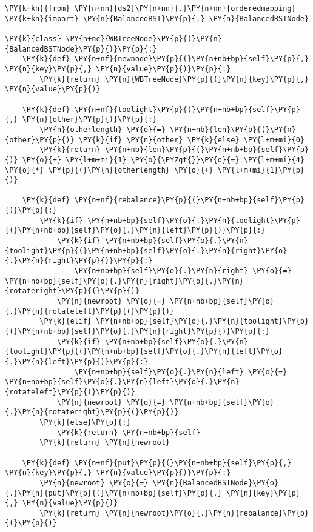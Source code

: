 \begin{Verbatim}[commandchars=\\\{\}]
\PY{k+kn}{from} \PY{n+nn}{ds2}\PY{n+nn}{.}\PY{n+nn}{orderedmapping} \PY{k+kn}{import} \PY{n}{BalancedBST}\PY{p}{,} \PY{n}{BalancedBSTNode}

\PY{k}{class} \PY{n+nc}{WBTreeNode}\PY{p}{(}\PY{n}{BalancedBSTNode}\PY{p}{)}\PY{p}{:}
    \PY{k}{def} \PY{n+nf}{newnode}\PY{p}{(}\PY{n+nb+bp}{self}\PY{p}{,} \PY{n}{key}\PY{p}{,} \PY{n}{value}\PY{p}{)}\PY{p}{:}
        \PY{k}{return} \PY{n}{WBTreeNode}\PY{p}{(}\PY{n}{key}\PY{p}{,} \PY{n}{value}\PY{p}{)}

    \PY{k}{def} \PY{n+nf}{toolight}\PY{p}{(}\PY{n+nb+bp}{self}\PY{p}{,} \PY{n}{other}\PY{p}{)}\PY{p}{:}
        \PY{n}{otherlength} \PY{o}{=} \PY{n+nb}{len}\PY{p}{(}\PY{n}{other}\PY{p}{)} \PY{k}{if} \PY{n}{other} \PY{k}{else} \PY{l+m+mi}{0}
        \PY{k}{return} \PY{n+nb}{len}\PY{p}{(}\PY{n+nb+bp}{self}\PY{p}{)} \PY{o}{+} \PY{l+m+mi}{1} \PY{o}{\PYZgt{}}\PY{o}{=} \PY{l+m+mi}{4} \PY{o}{*} \PY{p}{(}\PY{n}{otherlength} \PY{o}{+} \PY{l+m+mi}{1}\PY{p}{)}

    \PY{k}{def} \PY{n+nf}{rebalance}\PY{p}{(}\PY{n+nb+bp}{self}\PY{p}{)}\PY{p}{:}
        \PY{k}{if} \PY{n+nb+bp}{self}\PY{o}{.}\PY{n}{toolight}\PY{p}{(}\PY{n+nb+bp}{self}\PY{o}{.}\PY{n}{left}\PY{p}{)}\PY{p}{:}
            \PY{k}{if} \PY{n+nb+bp}{self}\PY{o}{.}\PY{n}{toolight}\PY{p}{(}\PY{n+nb+bp}{self}\PY{o}{.}\PY{n}{right}\PY{o}{.}\PY{n}{right}\PY{p}{)}\PY{p}{:}
                \PY{n+nb+bp}{self}\PY{o}{.}\PY{n}{right} \PY{o}{=} \PY{n+nb+bp}{self}\PY{o}{.}\PY{n}{right}\PY{o}{.}\PY{n}{rotateright}\PY{p}{(}\PY{p}{)}
            \PY{n}{newroot} \PY{o}{=} \PY{n+nb+bp}{self}\PY{o}{.}\PY{n}{rotateleft}\PY{p}{(}\PY{p}{)}
        \PY{k}{elif} \PY{n+nb+bp}{self}\PY{o}{.}\PY{n}{toolight}\PY{p}{(}\PY{n+nb+bp}{self}\PY{o}{.}\PY{n}{right}\PY{p}{)}\PY{p}{:}
            \PY{k}{if} \PY{n+nb+bp}{self}\PY{o}{.}\PY{n}{toolight}\PY{p}{(}\PY{n+nb+bp}{self}\PY{o}{.}\PY{n}{left}\PY{o}{.}\PY{n}{left}\PY{p}{)}\PY{p}{:}
                \PY{n+nb+bp}{self}\PY{o}{.}\PY{n}{left} \PY{o}{=} \PY{n+nb+bp}{self}\PY{o}{.}\PY{n}{left}\PY{o}{.}\PY{n}{rotateleft}\PY{p}{(}\PY{p}{)}
            \PY{n}{newroot} \PY{o}{=} \PY{n+nb+bp}{self}\PY{o}{.}\PY{n}{rotateright}\PY{p}{(}\PY{p}{)}
        \PY{k}{else}\PY{p}{:}
            \PY{k}{return} \PY{n+nb+bp}{self}
        \PY{k}{return} \PY{n}{newroot}

    \PY{k}{def} \PY{n+nf}{put}\PY{p}{(}\PY{n+nb+bp}{self}\PY{p}{,} \PY{n}{key}\PY{p}{,} \PY{n}{value}\PY{p}{)}\PY{p}{:}
        \PY{n}{newroot} \PY{o}{=} \PY{n}{BalancedBSTNode}\PY{o}{.}\PY{n}{put}\PY{p}{(}\PY{n+nb+bp}{self}\PY{p}{,} \PY{n}{key}\PY{p}{,} \PY{n}{value}\PY{p}{)}
        \PY{k}{return} \PY{n}{newroot}\PY{o}{.}\PY{n}{rebalance}\PY{p}{(}\PY{p}{)}


\end{Verbatim}

